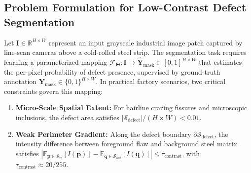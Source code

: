 \documentclass{ieeeaccess}
\begin{document}
\subsection{Problem Formulation for Low-Contrast Defect Segmentation}
Let $\mathbf{I} \in \mathbb{R}^{H \times W}$ represent an input grayscale industrial image patch captured by line-scan cameras above a cold-rolled steel strip. The segmentation task requires learning a parameterized mapping $\mathcal{F}_{\boldsymbol{\Theta}}: \mathbf{I} \to \hat{\mathbf{Y}}_{\text{mask}} \in [0, 1]^{H \times W}$ that estimates the per-pixel probability of defect presence, supervised by ground-truth annotation $\mathbf{Y}_{\text{mask}} \in \{0, 1\}^{H \times W}$. In practical factory scenarios, two critical constraints govern this mapping:
\begin{enumerate}
    \item \textbf{Micro-Scale Spatial Extent:} For hairline crazing fissures and microscopic inclusions, the defect area satisfies $|\mathcal{S}_{\text{defect}}| / (H \times W) < 0.01$.
    \item \textbf{Weak Perimeter Gradient:} Along the defect boundary $\partial \mathcal{S}_{\text{defect}}$, the intensity difference between foreground flaw and background steel matrix satisfies $|\mathbb{E}_{\mathbf{p} \in \mathcal{S}_{\text{in}}}[I(\mathbf{p})] - \mathbb{E}_{\mathbf{q} \in \mathcal{S}_{\text{out}}}[I(\mathbf{q})]| \le \tau_{\text{contrast}}$, with $\tau_{\text{contrast}} \approx 20/255$.
\end{enumerate}
\end{document}
